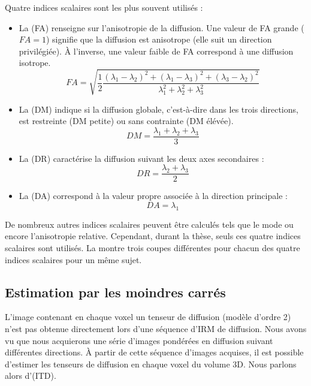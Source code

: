 Quatre indices scalaires sont les plus souvent utilisés :
\begin{itemize}
    \item La \fa (FA) renseigne sur l'anisotropie de la diffusion. 
    Une valeur de FA grande ($FA=1$) signifie que la diffusion est anisotrope (elle suit un direction privilégiée).
    À l'inverse, une valeur faible de FA correspond à une diffusion isotrope.
    \begin{equation}
        FA = \sqrt{\frac{1}{2}\frac{(\lambda_1 -\lambda_2)^2 + (\lambda_1 -\lambda_3)^2 + (\lambda_3 -\lambda_2)^2 }{\lambda_1^2 + \lambda_2^2 + \lambda_3^2}}
        \label{eq:fa}
    \end{equation}
    \item La \md (DM) indique si la diffusion globale, c'est-à-dire dans les trois directions, est restreinte (DM petite) ou sans contrainte (DM élévée).
    \begin{equation}
        DM = \frac{\lambda_1 + \lambda_2 + \lambda_3}{3}
        \label{eq:md}
    \end{equation}
    \item La \dr (DR) caractérise la diffusion suivant les deux axes secondaires :
    \begin{equation}
	DR = \frac{\lambda_2 + \lambda_3}{2}
        \label{eq:dr}
    \end{equation}
    \item La \da (DA) correspond à la valeur propre associée à la direction principale :
    \begin{equation}
	DA = \lambda_1
        \label{eq:da}
    \end{equation}
\end{itemize}

De nombreux autres indices scalaires peuvent être calculés tels que le mode ou encore l'anisotropie relative.
Cependant, durant la thèse, seuls ces quatre indices scalaires sont utilisés.
La  montre trois coupes différentes pour chacun des quatre indices scalaires pour un même sujet.


\subsection{Estimation par les moindres carrés}
L'image contenant en chaque voxel un tenseur de diffusion (modèle d'ordre 2) n'est pas obtenue directement lors d'une séquence d'IRM de diffusion.
Nous avons vu que nous acquierons une série d'images pondérées en diffusion suivant différentes directions.
À partir de cette séquence d'images acquises, il est possible d'estimer les tenseurs de diffusion en chaque voxel du volume 3D.
Nous parlons alors d'\itd (ITD).

